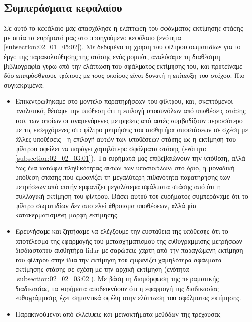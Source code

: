 \subsection{Συμπεράσματα κεφαλαίου}

Σε αυτό το κεφάλαιο μάς απασχόλησε η ελάττωση του σφάλματος εκτίμησης στάσης
με αιτία τα ευρήματά μας στο προηγούμενο κεφάλαιο
(ενότητα \ref{subsection:02_01_05:02}). Με δεδομένο τη χρήση του φίλτρου
σωματιδίων για το έργο της παρακολούθησης της στάσης ενός ρομπότ, αναλύσαμε τη
διαθέσιμη βιβλιογραφία γύρω από την ελάττωση του σφάλματος εκτίμησης του, και
προτείναμε δύο επιπρόσθετους τρόπους με τους οποίους είναι δυνατή η επίτευξη
του στόχου. Πιο συγκεκριμένα:

\begin{itemize}
  \item Επικεντρωθήκαμε στο μοντέλο παρατηρήσεων του φίλτρου, και, σκεπτόμενοι
        αναλυτικά, θέσαμε την υπόθεση ότι η επιλογή υποσυνόλων από υποθέσεις
        στάσης του, των οποίων οι αναμενόμενες μετρήσεις από αυτές συμβαδίζουν
        περισσότερο με τις εισερχόμενες στο φίλτρο μετρήσεις του αισθητήρα
        αποστάσεων σε σχέση με άλλες υποθέσεις---η επιλογή αυτών των υποθέσεων
        στάσης ως η εκτίμηση του φίλτρου οφείλει να παράγει χαμηλότερα σφάλματα
        στάσης (ενότητα \ref{subsection:02_02_03:01}). Τα ευρήματά μας
        επιβεβαιώνουν την υπόθεση, αλλά έως ένα κατώφλι πληθικότητας αυτών των
        υποσυνόλων: στο όριο, η μοναδική υπόθεση στάσης που εμφανίζει τη
        μεγαλύτερη πιθανότητα παρατήρησης των μετρήσεων από αυτήν εμφανίζει
        μεγαλύτερα σφάλματα στάσης από ότι η συλλογική εκτίμηση του φίλτρου.
        Βάσει αυτού του ευρήματος συμπεράναμε ότι το φίλτρο σωματιδίων δεν
        αποτελεί άθροισμα υποθέσεων, αλλά μία κατακερματισμένη μορφή εκτίμησης.
  \item Ερευνήσαμε και ζητήσαμε να ελέγξουμε την ευστάθεια της υπόθεσης ότι
        το αποτέλεσμα της εφαρμογής του μετασχηματισμού της ευθυγράμμισης
        μετρήσεων δισδιάστατου αισθητήρα lidar με σαρώσεις χάρτη από την
        παραγώμενη εκτίμηση του φίλτρου στην ίδια την εκτίμηση του εμφανίζει
        χαμηλότερα σφάλματα εκτίμησης στάσης σε σχέση με την αρχική εκτίμηση
        (ενότητα \ref{subsection:02_02_03:02}). Με βάση τη διαμόρφωση της
        πειραματικής διαδικασίας, τα ευρήματα αποδεικνύουν ότι η εφαρμογή της
        διαδικασίας ευθυγράμμισης έχει σημαντικά οφέλη στην ελάττωση του
        σφάλματος εκτίμησης.
  \item Παρακινούμενοι από ελλείψεις και μεινοκτήματα μεθόδων της τρέχουσας

\end{itemize}
